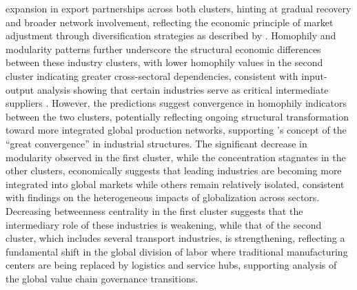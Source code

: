 \documentclass[preprint, 3p,
authoryear]{elsarticle} %
\begin{document}
expansion in export partnerships across both clusters, hinting at
gradual recovery and broader network involvement, reflecting the
economic principle of market adjustment through diversification
strategies as described by \citet{melitz2003impact}. Homophily and
modularity patterns further underscore the structural economic
differences between these industry clusters, with lower homophily values
in the second cluster indicating greater cross-sectoral dependencies,
consistent with input-output analysis showing that certain industries
serve as critical intermediate suppliers
\citep{leontief1986input, de2024input}. However, the predictions suggest
convergence in homophily indicators between the two clusters,
potentially reflecting ongoing structural transformation toward more
integrated global production networks, supporting
\citet{baldwin2016great}'s concept of the ``great convergence'' in
industrial structures. The significant decrease in modularity observed
in the first cluster, while the concentration stagnates in the other
clusters, economically suggests that leading industries are becoming
more integrated into global markets while others remain relatively
isolated, consistent with \citet{autor2016china} findings on the
heterogeneous impacts of globalization across sectors. Decreasing
betweenness centrality in the first cluster suggests that the
intermediary role of these industries is weakening, while that of the
second cluster, which includes several transport industries, is
strengthening, reflecting a fundamental shift in the global division of
labor where traditional manufacturing centers are being replaced by
logistics and service hubs, supporting \citet{gereffi2017global}
analysis of the global value chain governance transitions.
\end{document}
